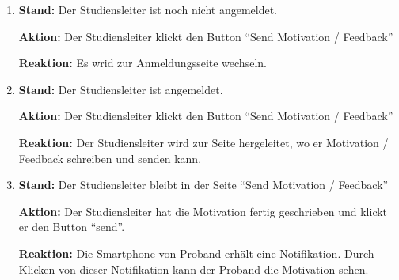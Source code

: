 \documentclass[a4paper]{scrreprt}
\begin{document}
\begin{itemize}
                    \begin{enumerate}
                        \item \par \textbf{Stand: } Der \gls{Studiensleiter} ist noch nicht angemeldet.
                              \par \textbf{Aktion: } Der \gls{Studiensleiter} klickt den Button ``Send Motivation / Feedback''
                              \par \textbf{Reaktion: } Es wrid zur Anmeldungsseite wechseln.
                        \item \par \textbf{Stand: } Der \gls{Studiensleiter} ist angemeldet.
                              \par \textbf{Aktion: }  Der \gls{Studiensleiter} klickt den Button ``Send Motivation / Feedback''
                              \par \textbf{Reaktion: } Der \gls{Studiensleiter} wird zur Seite hergeleitet, wo er Motivation / Feedback schreiben und senden kann.
                        \item \par \textbf{Stand: } Der \gls{Studiensleiter} bleibt in der Seite ``Send Motivation / Feedback''
                              \par \textbf{Aktion: } Der \gls{Studiensleiter} hat die Motivation fertig geschrieben und klickt er den Button ``send''.
                              \par \textbf{Reaktion: } Die Smartphone von \gls{Proband} erh\"alt eine Notifikation. Durch Klicken von dieser Notifikation kann der \gls{Proband} die Motivation sehen.
                    \end{enumerate}




\end{itemize}
\end{document}
